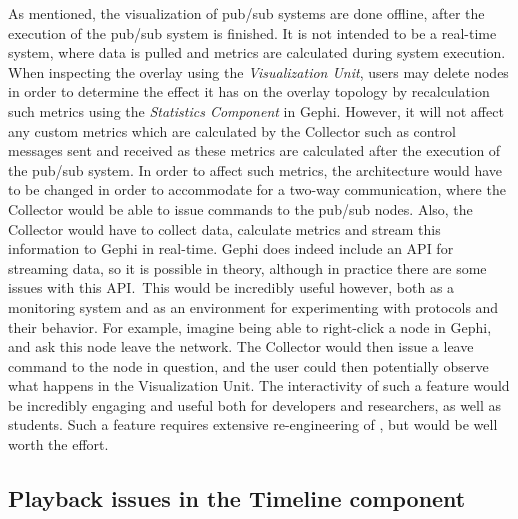 As mentioned, the visualization of pub/sub systems are done offline,
after the execution of the pub/sub system is finished. It is not
intended to be a real-time system, where data is pulled and metrics are
calculated during system execution. When inspecting the overlay using
the \emph{Visualization Unit}, users may delete nodes in order to
determine the effect it has on the overlay topology by recalculation
such metrics using the \emph{Statistics Component} in Gephi. However, it will
not affect any custom metrics which are calculated by the Collector such
as control messages sent and received as these metrics are calculated
after the execution of the pub/sub system. In order to affect such
metrics, the architecture would have to be changed in order to
accommodate for a two-way communication, where the Collector would be
able to issue commands to the pub/sub nodes. Also, the Collector would
have to collect data, calculate metrics and stream this information to
Gephi in real-time. Gephi does indeed include an API for streaming data,
so it is possible in theory, although in practice there are some issues
with this API.\ This would be incredibly useful however, both as a
monitoring system and as an environment for experimenting with protocols
and their behavior. For example, imagine being able to right-click a
node in Gephi, and ask this node leave the network. The Collector would
then issue a leave command to the node in question, and the user could
then potentially observe what happens in the Visualization Unit. The
interactivity of such a feature would be incredibly engaging and useful
both for developers and researchers, as well as students. Such
a feature requires extensive re-engineering of \demo{}, but would be
well worth the effort.

\subsection{Playback issues in the Timeline component}

